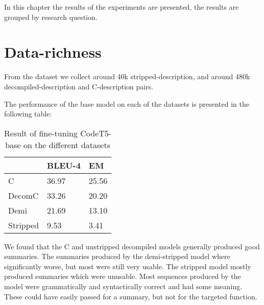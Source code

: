 In this chapter the results of the experiments are presented, the results are grouped by research question.


\section{Data-richness}
From the dataset we collect around 40k stripped-description, and around 480k decompiled-description and C-description pairs. 

The performance of the base model on each of the datasets is presented in the following table:
\label{tab:duplicated}
\begin{table}[!h]
\centering
\begin{tabular}{lll}
\hline
\rowcolor[HTML]{C0C0C0} 
\multicolumn{1}{|l}{\cellcolor[HTML]{C0C0C0}\textbf{Duplicated}} & BLEU-4  & \multicolumn{1}{l|}{\cellcolor[HTML]{C0C0C0}EM} \\ \hline
C                                                                  & 36.97 & 25.56                                           \\
DecomC                                                             & 33.26 & 20.20                                           \\
Demi                                                               & 21.69 & 13.10   
                            \\
Stripped                                                           & 9.53  & 3.41                \end{tabular}
\caption{Result of fine-tuning CodeT5-base on the different datasets}
\end{table}

We found that the C and unstripped decompiled models generally produced good summaries. The summaries produced by the demi-stripped model where significantly worse, but most were still very usable. The stripped model mostly produced summaries which were unusable. Most sequences produced by the model were grammatically and syntactically correct and had some meaning. These could have easily passed for a summary, but not for the targeted function.

